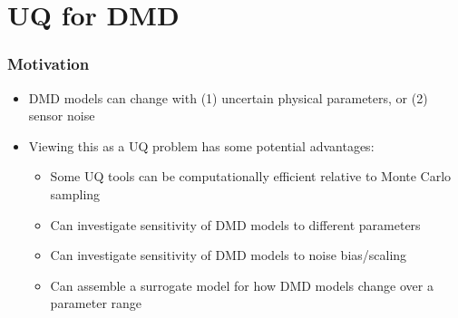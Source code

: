 \documentclass[9pt]{beamer}
\begin{document}
\section{UQ for DMD}
\label{sec-4}
\begin{frame}
\frametitle{Motivation}
\label{sec-4-1}

\begin{itemize}
\item DMD models can change with (1) uncertain physical parameters, or (2) sensor noise
\item Viewing this as a UQ problem has some potential advantages:
\begin{itemize}
\item Some UQ tools can be computationally efficient relative to Monte Carlo sampling
\item Can investigate sensitivity of DMD models to different parameters
\item Can investigate sensitivity of DMD models to noise bias/scaling
\item Can assemble a surrogate model for how DMD models change over a parameter range
\end{itemize}
\end{itemize}
\end{frame}
\end{document}
